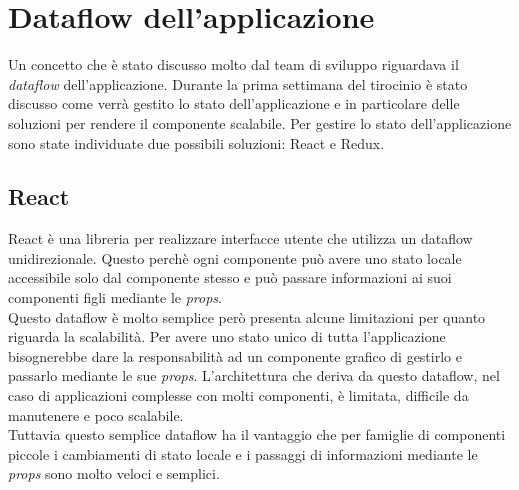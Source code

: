 \section{Dataflow dell'applicazione}
Un concetto che è stato discusso molto dal team di sviluppo riguardava il \emph{dataflow} dell'applicazione. Durante la prima settimana del tirocinio è stato discusso come verrà gestito lo stato dell'applicazione e in particolare delle soluzioni per rendere il componente scalabile. Per gestire lo stato dell'applicazione sono state individuate due possibili soluzioni: React e Redux.

\subsection{React}
React è una libreria per realizzare interfacce utente che utilizza un dataflow unidirezionale. Questo perchè ogni componente può avere uno stato locale accessibile solo dal componente stesso e può passare informazioni ai suoi componenti figli mediante le \emph{props}. \\
Questo dataflow è molto semplice però presenta alcune limitazioni per quanto riguarda la scalabilità. Per avere uno stato unico di tutta l'applicazione bisognerebbe dare la responsabilità ad un componente grafico di gestirlo e passarlo mediante le sue \emph{props}. L'architettura che deriva da questo dataflow, nel caso di applicazioni complesse con molti componenti, è limitata, difficile da manutenere e poco scalabile. \\
Tuttavia questo semplice dataflow ha il vantaggio che per famiglie di componenti piccole i cambiamenti di stato locale e i passaggi di informazioni mediante le \emph{props} sono molto veloci e semplici.

